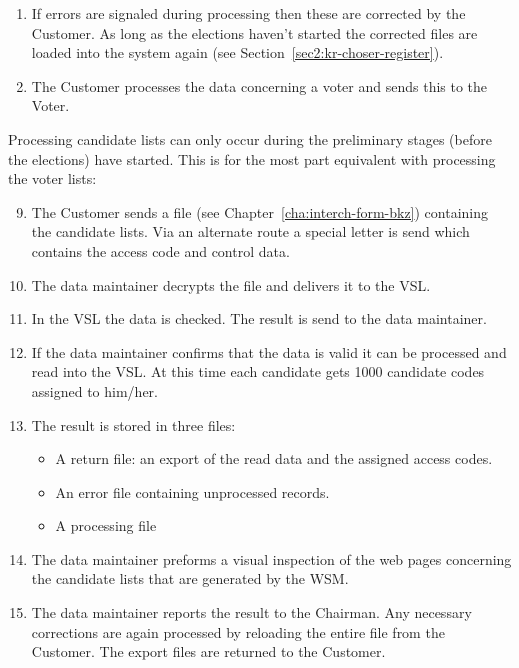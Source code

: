 \begin{enumerate}
	\item If errors are signaled during processing then these are
	corrected by the Customer. As long as the elections haven't
	started the corrected files are loaded into the system again
	(see Section~\ref{sec2:kr-choser-register}).

	\item The Customer processes the data concerning a voter and
	sends this to the Voter.

\end{enumerate}

Processing candidate lists can only occur during the preliminary
stages (before the elections) have started. This is for the most part
equivalent with processing the voter lists:

\begin{enumerate}
\setcounter{enumi}{8}
	\item The Customer sends a file (see
	Chapter~\ref{cha:interch-form-bkz}) containing the candidate
	lists. Via an alternate route a special letter is send which
	contains the access code and control data.

	\item The data maintainer decrypts the file and delivers it to
	the VSL.

	\item In the VSL the data is checked. The result is send to
	the data maintainer.

	\item If the data maintainer confirms that the data is valid
	it can be processed and read into the VSL. At this time each
	candidate gets 1000 candidate codes assigned to him/her.

	\item The result is stored in three files:

	\begin{itemize}
		
		\item A return file: an export of the read data and
		the assigned access codes.
		
		\item An error file containing unprocessed records.

		\item A processing file

	\end{itemize}

	\item The data maintainer preforms a visual inspection of the
	web pages concerning the candidate lists that are generated by
	the WSM. 

	\item The data maintainer reports the result to the
	Chairman. Any necessary corrections are again processed by
	reloading the entire file from the Customer. The export files
	are returned to the Customer.

\end{enumerate}

